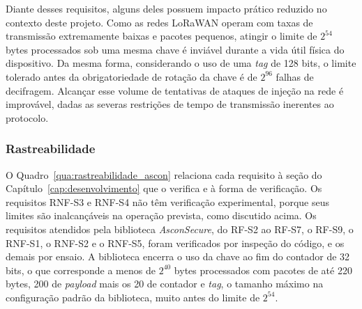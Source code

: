 Diante desses requisitos, alguns deles possuem impacto prático reduzido no contexto deste projeto. Como as redes LoRaWAN operam com taxas de transmissão extremamente baixas e pacotes pequenos, atingir o limite de $2^{54}$ bytes processados sob uma mesma chave é inviável durante a vida útil física do dispositivo. Da mesma forma, considerando o uso de uma \textit{tag} de 128 bits, o limite tolerado antes da obrigatoriedade de rotação da chave é de $2^{96}$ falhas de decifragem. Alcançar esse volume de tentativas de ataques de injeção na rede é improvável, dadas as severas restrições de tempo de transmissão inerentes ao protocolo.

\subsubsection{Rastreabilidade}
O Quadro~\ref{qua:rastreabilidade_ascon} relaciona cada requisito à seção do Capítulo~\ref{cap:desenvolvimento} que o verifica e à forma de verificação. Os requisitos RNF-S3 e RNF-S4 não têm verificação experimental, porque seus limites são inalcançáveis na operação prevista, como discutido acima. Os requisitos atendidos pela biblioteca \textit{AsconSecure}, do RF-S2 ao RF-S7, o RF-S9, o RNF-S1, o RNF-S2 e o RNF-S5, foram verificados por inspeção do código, e os demais por ensaio. A biblioteca encerra o uso da chave ao fim do contador de 32 bits, o que corresponde a menos de $2^{40}$ bytes processados com pacotes de até 220 bytes, 200 de \textit{payload} mais os 20 de contador e \textit{tag}, o tamanho máximo na configuração padrão da biblioteca, muito antes do limite de $2^{54}$.

